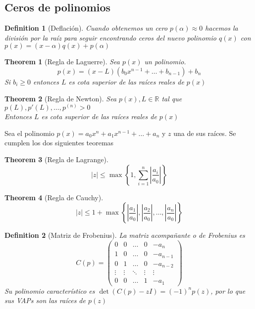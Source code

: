\documentclass[leqno]{article}
\newtheorem*{definition}{Definition}
\newtheorem*{theorem}{Theorem}
\begin{document}
\subsection{Ceros de polinomios}
\begin{definition}[Deflación] Cuando obtenemos un cero $p(\alpha ) \approx 0$ hacemos la división por la raíz para seguir encontrando ceros del nuevo polinomio $q(x)$ con $p(x)=(x-\alpha )q(x) + p(\alpha )$

\end{definition}

\begin{theorem}[Regla de Laguerre]
Sea $p(x)$ un polinomio.
\[
p(x)=(x-L)(b_0 x^{n-1}+\ldots+b_{n-1}) + b_n
\]
Si $b_i\ge 0$ entonces $L$ es cota superior de las raíces reales de  $p(x)$
\end{theorem}

\begin{theorem}[Regla de Newton]
Sea $p(x), L\in \mathbb{R}$ tal que $p(L), p'(L), \ldots , p^{(n)}>0$\\
Entonces $L$ es cota superior de las raíces reales de  $p(x)$
\end{theorem}

Sea el polinomio $p(x) = a_0x^n + a_1x^{n-1} + \ldots + a_n$ y $z$ una de sus raíces. Se cumplen los dos siguientes teoremas
\begin{theorem}[Regla de Lagrange]
\[
|z| \le \max \left\{ 1, \sum_{i=1}^{n} \left|\frac{a_i}{a_0}\right| \right\}
\] 
\end{theorem}

\begin{theorem}[Regla de Cauchy]
 \[
|z|\le 1+\max \left\{  \left|\frac{a_1}{a_0}\right|, \left|\frac{a_2}{a_0}\right|, \ldots, \left|\frac{a_n}{a_0}\right| \right\} 
\] 
\end{theorem}

\begin{definition}[Matriz de Frobenius] La matriz acompañante o de Frobenius es
  \[
	C(p) = \begin{pmatrix} 
	  0 & 0 & \ldots & 0 & -a_n \\
	  1 & 0 & \ldots & 0 & -a_{n-1} \\
	  0 & 1 & \ldots & 0 & -a_{n-2} \\
	  \vdots & \vdots & \ddots & \vdots & \vdots \\ 
	  0 & 0 & \ldots & 1 & -a_1
	\end{pmatrix}   
  \] 
Su polinomio característico es $\det(C(p)-zI) = (-1)^np(z)$, por lo que sus VAPs son las raíces de $p(z)$
\end{definition}
\end{document}
